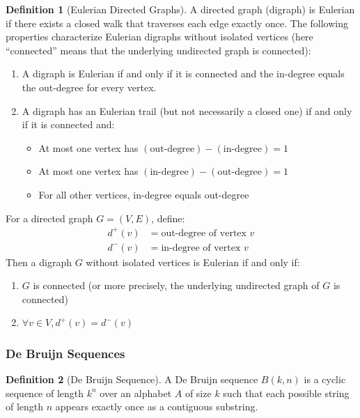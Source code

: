 \documentclass{article}
\theoremstyle{definition}
\newtheorem{definition}{Definition}
\begin{document}
\begin{definition}[Eulerian Directed Graphs]
A directed graph (digraph) is Eulerian if there exists a closed walk that traverses each edge exactly once. The following properties characterize Eulerian digraphs without isolated vertices (here ``connected'' means that the underlying undirected graph is connected):
\begin{enumerate}
    \item A digraph is Eulerian if and only if it is connected and the in-degree equals the out-degree for every vertex.
    \item A digraph has an Eulerian trail (but not necessarily a closed one) if and only if it is connected and:
    \begin{itemize}
        \item At most one vertex has $(\text{out-degree}) - (\text{in-degree}) = 1$
        \item At most one vertex has $(\text{in-degree}) - (\text{out-degree}) = 1$
        \item For all other vertices, in-degree equals out-degree
    \end{itemize}
\end{enumerate}
For a directed graph $G = (V, E)$, define:
\begin{align}
    d^+(v) &= \text{out-degree of vertex } v\\
    d^-(v) &= \text{in-degree of vertex } v
\end{align}
Then a digraph $G$ without isolated vertices is Eulerian if and only if:
\begin{enumerate}
    \item $G$ is connected (or more precisely, the underlying undirected graph of $G$ is connected)
    \item $\forall v \in V, d^+(v) = d^-(v)$
\end{enumerate}
\end{definition}

\subsubsection{De Bruijn Sequences}


\begin{definition}[De Bruijn Sequence]
A De Bruijn sequence $B(k, n)$ is a cyclic sequence of length $k^n$ over an alphabet $A$ of size $k$ such that each possible string of length $n$ appears exactly once as a contiguous substring.
\end{definition}
\end{document}
